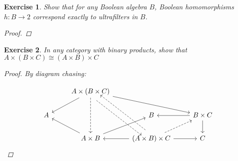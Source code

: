 \documentclass[]{article}
\newtheorem{exercise}{Exercise}
\newcommand{\tfarr}[4][\to]{\ensuremath{#2 : #3 #1 #4}}
\begin{document}
\begin{exercise}
  Show that for any Boolean algebra $B$, Boolean homomorphisms \tfarr{h}{B}{2}
  correspond exactly to ultrafilters in $B$.
  \begin{proof}
    \todo{}
  \end{proof}
\end{exercise}

\begin{exercise}
  In any category with binary products, show that $A\times (B\times C) \cong
  (A\times B)\times C$

  \begin{proof}
    By diagram chasing:

$$\begin{tikzcd}
  & A\times (B\times C) \arrow{dl} \arrow[dashed]{dd} \arrow[dashed, shift right=2]{ddr} \arrow{drr} & & \\
  A & & B & B \times C \arrow{l} \arrow{d} \\
  & A\times B \arrow{ul} \arrow{ur} & (A \times B) \times C \arrow[dashed,
  shift right=2]{uul} \arrow{l} \arrow{r} \arrow[dashed]{ur} & C
\end{tikzcd}$$
  \end{proof}
\end{exercise}
\end{document}
